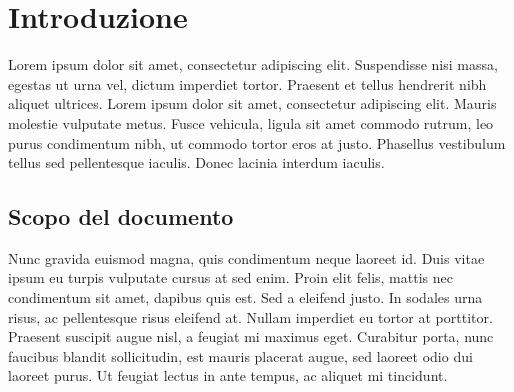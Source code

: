 \documentclass[a4paper,12pt]{book}
\begin{document}
	\chapter{Introduzione}
		Lorem ipsum dolor sit amet, consectetur adipiscing elit. Suspendisse nisi massa, egestas ut urna vel, dictum imperdiet tortor. Praesent et tellus hendrerit nibh aliquet ultrices. Lorem ipsum dolor sit amet, consectetur adipiscing elit. Mauris molestie vulputate metus. Fusce vehicula, ligula sit amet commodo rutrum, leo purus condimentum nibh, ut commodo tortor eros at justo. Phasellus vestibulum tellus sed pellentesque iaculis. Donec lacinia interdum iaculis.
		
		
		\section{Scopo del documento}
		Nunc gravida euismod magna, quis condimentum neque laoreet id. Duis vitae ipsum eu turpis vulputate cursus at sed enim. Proin elit felis, mattis nec condimentum sit amet, dapibus quis est. Sed a eleifend justo. In sodales urna risus, ac pellentesque risus eleifend at. Nullam imperdiet eu tortor at porttitor. Praesent suscipit augue nisl, a feugiat mi maximus eget. Curabitur porta, nunc faucibus blandit sollicitudin, est mauris placerat augue, sed laoreet odio dui laoreet purus. Ut feugiat lectus in ante tempus, ac aliquet mi tincidunt.
			
	\label{LastPage}
\end{document}
